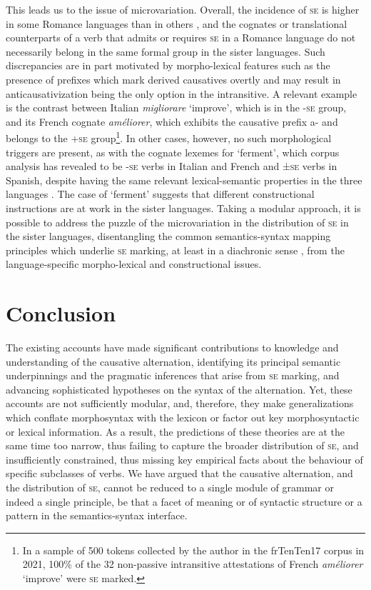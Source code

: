 \documentclass[output=paper,colorlinks,citecolor=brown
]{langscibook}
\begin{document}
This leads us to the issue of microvariation. Overall, the incidence of \textsc{se} is higher in some Romance languages than in others \citep{heidinger2015causalness}, and the cognates or translational counterparts of a verb that admits or requires \textsc{se} in a Romance language do not necessarily belong in the same formal group in the sister languages. Such discrepancies are in part motivated by morpho-lexical features such as the presence of prefixes which mark derived causatives overtly and may result in anticausativization being the only option in the intransitive. A relevant example is the contrast between Italian \textit{migliorare} ‘improve’, which is in the -\textsc{se} group, and its French cognate \textit{améliorer}, which exhibits the causative prefix a- and belongs to the +\textsc{se} group\footnote{In a sample of 500 tokens collected by the author in the frTenTen17 corpus \citep{jakubicek2013tenten} in 2021, 100\% of the 32 non-passive intransitive attestations of French \textit{améliorer} ‘improve’ were \textsc{se} marked.}.  In other cases, however, no such morphological triggers are present, as with the cognate lexemes for ‘ferment’, which corpus analysis has revealed to be -\textsc{se} verbs in Italian and French and ±\textsc{se} verbs in Spanish, despite having the same relevant lexical-semantic properties in the three languages \citep{bentley2023internally}. The case of ‘ferment’ suggests that different constructional instructions are at work in the sister languages. Taking a modular approach, it is possible to address the puzzle of the microvariation in the distribution of \textsc{se} in the sister languages, disentangling the common semantics-syntax mapping principles which underlie \textsc{se} marking, at least in a diachronic sense \citep{cennamo1995patterns}, from the language-specific morpho-lexical and constructional issues. 

\section{Conclusion}
\label{bentley_section_6}
The existing accounts have made significant contributions to knowledge and understanding of the causative alternation, identifying its principal semantic underpinnings and the pragmatic inferences that arise from \textsc{se} marking, and advancing sophisticated hypotheses on the syntax of the alternation. Yet, these accounts are not sufficiently modular, and, therefore, they make generalizations which conflate morphosyntax with the lexicon or factor out key morphosyntactic or lexical information.  As a result, the predictions of these theories are at the same time too narrow, thus failing to capture the broader distribution of \textsc{se}, and insufficiently constrained, thus missing key empirical facts about the behaviour of specific subclasses of verbs. We have argued that the causative alternation, and the distribution of \textsc{se}, cannot be reduced to a single module of grammar or indeed a single principle, be that a facet of meaning or of syntactic structure or a pattern in the semantics-syntax interface. 
\end{document}
